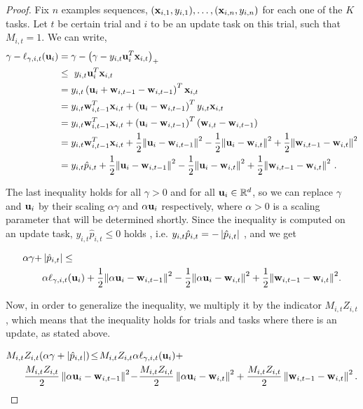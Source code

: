 {\begin{proof}
Fix $n$ examples sequences, $(\mathbf{x}_{i,1},y_{i,1}),\ldots,(\mathbf{x}_{i,n},y_{i,n})$ for each one of the $K$ tasks. 
Let $t$ be certain trial and $i$ to be an update task on this trial, such that $M_{i,t}=1$. 
We can write,
\begin{align*}
\gamma-\ell_{\gamma,i,t}(\mathbf{u}_i)&=\gamma-\left({\gamma-y_{i,t}\mathbf{u}_i^T\mathbf{x}_{i,t}}\right)_+\\
 ~&\le~  y_{i,t}\mathbf{u}_i^{T}\mathbf{x}_{i,t} \\
&= y_{i,t}\left({\mathbf{u}_i+\mathbf{w}_{i,t-1}-\mathbf{w}_{i,t-1}}\right)^{T}\mathbf{x}_{i,t}\\
&= y_{i,t}\mathbf{w}_{i,t-1}^{T}\mathbf{x}_{i,t}+\left({\mathbf{u}_i-\mathbf{w}_{i,t-1}}\right)^{T}y_{i,t}\mathbf{x}_{i,t}\\
&= y_{i,t}\mathbf{w}_{i,t-1}^{T}\mathbf{x}_{i,t}+\left({\mathbf{u}_i-\mathbf{w}_{i,t-1}}\right)^{T}\left({\mathbf{w}_{i,t}-\mathbf{w}_{i,t-1}}\right)\\
&=  y_{i,t}\mathbf{w}_{i,t-1}^{T}\mathbf{x}_{i,t}+\frac{1}{2}{\left\Vert {\mathbf{u}_{i}-\mathbf{w}_{i,t-1}} \right\Vert^2}
        -\frac{1}{2}{\left\Vert {\mathbf{u}_i-\mathbf{w}_{i,t}} \right\Vert^2}+\frac{1}{2}{\left\Vert {\mathbf{w}_{i,t-1}-\mathbf{w}_{i,t}} \right\Vert^2}\\
&=  y_{i,t}\hat{p}_{i,t}+\frac{1}{2}{\left\Vert {\mathbf{u}_{i}-\mathbf{w}_{i,t-1}} \right\Vert^2}
        -\frac{1}{2}{\left\Vert {\mathbf{u}_i-\mathbf{w}_{i,t}} \right\Vert^2}+\frac{1}{2}{\left\Vert {\mathbf{w}_{i,t-1}-\mathbf{w}_{i,t}} \right\Vert^2}~.
\end{align*}

\noindent
The last inequality holds for all $\gamma>0$ and for all
$\mathbf{u}_i\in\mathbb{R}^d$, so we can replace $\gamma$ and $\mathbf{u}_i$ by their
scaling $\alpha\gamma$ and $\alpha \mathbf{u}_i$ respectively, where $\alpha>0$
is a scaling parameter that will be determined shortly. Since the inequality is computed on an update task,
$y_{i,t}\hat{p}_{i,t}\le0$ holds , i.e. $y_{i,t}\hat{p}_{i,t}=-\left\vert{\hat{p}_{i,t}}\right\vert$ , and we get

\begin{equation}
\begin{split}
\alpha\gamma  +&\left\vert{\hat{p}_{i,t}}\right\vert \le\\
&\alpha\ell_{\gamma,i,t}(\mathbf{u}_i)+\frac{1}{2}{\left\Vert {\alpha \mathbf{u}_i-\mathbf{w}_{i,t-1}} \right\Vert^2}-\frac{1}{2}{\left\Vert {\alpha \mathbf{u}_i-\mathbf{w}_{i,t}} \right\Vert^2}+\frac{1}{2}{\left\Vert {\mathbf{w}_{i,t-1}-\mathbf{w}_{i,t}} \right\Vert^2} .\end{split}
\label{eq:FO_introducing_alpha}
\end{equation}

\noindent
Now, in order to generalize the inequality, we multiply it by the indicator $M_{i,t}Z_{i,t}$ , 
which means that the inequality holds for  trials and tasks where there is an update, as stated above.

\begin{equation}
\begin{split}
M_{i,t}&Z_{i,t}{\left({\alpha\gamma +\left\vert{\hat{p}_{i,t}}\right\vert}\right)} \!\le\! M_{i,t}Z_{i,t}\alpha \ell_{\gamma,i,t}(\mathbf{u}_i)
+\\ &\frac{M_{i,t}Z_{i,t}}{2}\left\Vert {\alpha \mathbf{u}_i-\mathbf{w}_{i,t-1}} \right\Vert^2\!-\!\frac{M_{i,t}Z_{i,t}}{2}\left\Vert {\alpha \mathbf{u}_i-\mathbf{w}_{i,t}} \right\Vert^2+
\frac{M_{i,t}Z_{i,t}}{2}\left\Vert {\mathbf{w}_{i,t-1}-\mathbf{w}_{i,t}} \right\Vert^2.
\end{split}
\label{eq:label}
\end{equation} 


\end{proof}}
